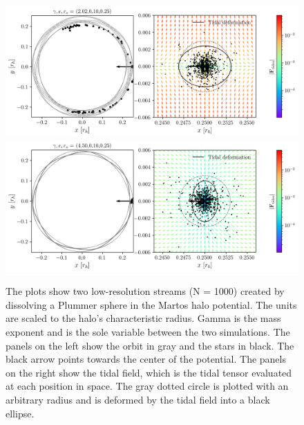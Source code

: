             \begin{figure}
                \includegraphics[width=\linewidth]{images/martos_tidal_field_202_10_25.png}
                \includegraphics[width=\linewidth]{images/martos_tidal_field_450_10_25.png}
                \caption{The plots show two low-resolution streams (N = 1000) created by dissolving a Plummer sphere in the Martos halo potential. The units are scaled to the halo's characteristic radius. Gamma is the mass exponent and is the sole variable between the two simulations. The panels on the left show the orbit in gray and the stars in black. The black arrow points towards the center of the potential. The panels on the right show the tidal field, which is the tidal tensor evaluated at each position in space. The gray dotted circle is plotted with an arbitrary radius and is deformed by the tidal field into a black ellipse.}
                \label{fig:martos_tidal_field_small_r}
            \end{figure}

